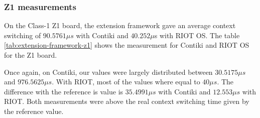 \subsubsection{Z1 measurements}
On the Class-1 Z1 board, the extension framework gave an average context switching of $90.5761\mu s$ with Contiki and $40.252\mu $s with RIOT OS.
The table \ref{tab:extension-framework-z1} shows the measurement for Contiki and RIOT OS for the Z1 board.

Once again, on Contiki, our values were largely distributed between $30.5175\mu s$ and $976.5625\mu s$.
With RIOT, most of the values where equal to $40 \mu s$.
The difference with the reference is value is $35.4991 \mu s$ with Contiki and $12.553 \mu s$ with RIOT.
Both measurements were above the real context switching time given by the reference value.








